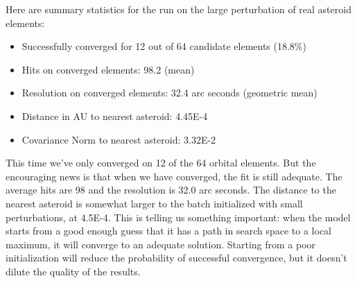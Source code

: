 Here are summary statistics for the run on the large perturbation of real asteroid elements:
\begin{itemize}
\item Successfully converged for 12 out of 64 candidate elements (18.8\%)
\item Hits on converged elements: 98.2 (mean)
\item Resolution on converged elements: 32.4 arc seconds (geometric mean)
\item Distance in AU to nearest asteroid: 4.45E-4
\item Covariance Norm to nearest asteroid: 3.32E-2
\end{itemize}
This time we've only converged on 12 of the 64 orbital elements.
But the encouraging news is that when we have converged, the fit is still adequate.
The average hits are 98 and the resolution is 32.0 arc seconds.
The distance to the nearest asteroid is somewhat larger to the batch initialized with small perturbations, at 4.5E-4.
This is telling us something important: 
when the model starts from a good enough guess that it has a path in search space to a local maximum, it will converge to an adequate solution.
Starting from a poor initialization will reduce the probability of successful convergence, but it doesn't dilute the quality of the results.
